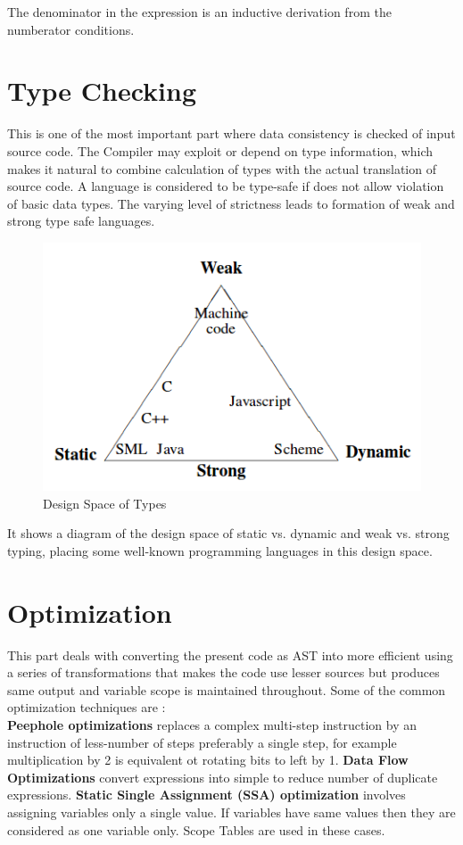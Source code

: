 The denominator in the expression is an inductive derivation from the numberator conditions.

\section{Type Checking}
This is one of the most important part where data consistency is checked of input source code. The Compiler may exploit or depend on type information, which makes it natural to combine calculation of types with the actual translation of source code. A language is considered to be type-safe if does not allow violation of basic data types. The varying level of strictness leads to formation of weak and strong type safe languages.\\

\begin{figure}[!htb]
\centering
  \includegraphics[scale=0.5]{type_check}
  \caption{Design Space of Types}
\end{figure}

It shows a diagram of the design space of static vs. dynamic and weak vs. strong typing, placing some well-known programming languages in this design space.

\section{Optimization}

This part deals with converting the present code as AST into more efficient using a series of transformations that makes the code use lesser sources but produces same output and variable scope is maintained throughout. Some of the common optimization techniques are :\\

\textbf{Peephole optimizations} replaces a complex multi-step instruction by an instruction of less-number of steps preferably a single step, for example multiplication by 2 is equivalent ot rotating bits to left by 1. \textbf{Data Flow Optimizations} convert expressions into simple to reduce number of duplicate expressions. \textbf{Static Single Assignment (SSA) optimization} involves assigning variables only a single value. If variables have same values then they are considered as one variable only. Scope Tables are used in these cases.

